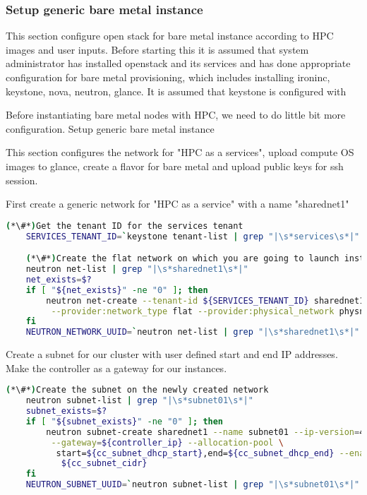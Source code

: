 \subsubsection{Setup generic bare metal instance}

This section configure open stack for bare metal instance according to HPC images and user inputs. Before starting this it is assumed that system administrator has installed openstack and its services and has done appropriate configuration for bare metal provisioning, which includes installing ironinc, keystone, nova, neutron, glance. It is assumed that keystone is configured with 

Before instantiating bare metal nodes with HPC, we need to do little bit more configuration. 
Setup generic bare metal instance

This section configures the network for "HPC as a services", upload compute OS images to glance, create a flavor for bare metal and upload public keys for ssh session.

First create a generic network for "HPC as a service" with a name "sharednet1"

\begin{lstlisting}[language=bash,keywords={}]
(*\#*)Get the tenant ID for the services tenant
    SERVICES_TENANT_ID=`keystone tenant-list | grep "|\s*services\s*|" | awk '{print $2}'`

    (*\#*)Create the flat network on which you are going to launch instances
    neutron net-list | grep "|\s*sharednet1\s*|"
    net_exists=$?
    if [ "${net_exists}" -ne "0" ]; then
        neutron net-create --tenant-id ${SERVICES_TENANT_ID} sharednet1 --shared \
         --provider:network_type flat --provider:physical_network physnet1
    fi
    NEUTRON_NETWORK_UUID=`neutron net-list | grep "|\s*sharednet1\s*|" | awk '{print $2}'`
\end{lstlisting}


Create a subnet for our cluster with user defined start and end IP addresses. Make the controller as a gateway for our instances.

\begin{lstlisting}[language=bash,keywords={}]
(*\#*)Create the subnet on the newly created network
    neutron subnet-list | grep "|\s*subnet01\s*|"
    subnet_exists=$?
    if [ "${subnet_exists}" -ne "0" ]; then
        neutron subnet-create sharednet1 --name subnet01 --ip-version=4 \
         --gateway=${controller_ip} --allocation-pool \
          start=${cc_subnet_dhcp_start},end=${cc_subnet_dhcp_end} --enable-dhcp \
           ${cc_subnet_cidr}
    fi
    NEUTRON_SUBNET_UUID=`neutron subnet-list | grep "|\s*subnet01\s*|" | awk '{print $2}'`
\end{lstlisting}

